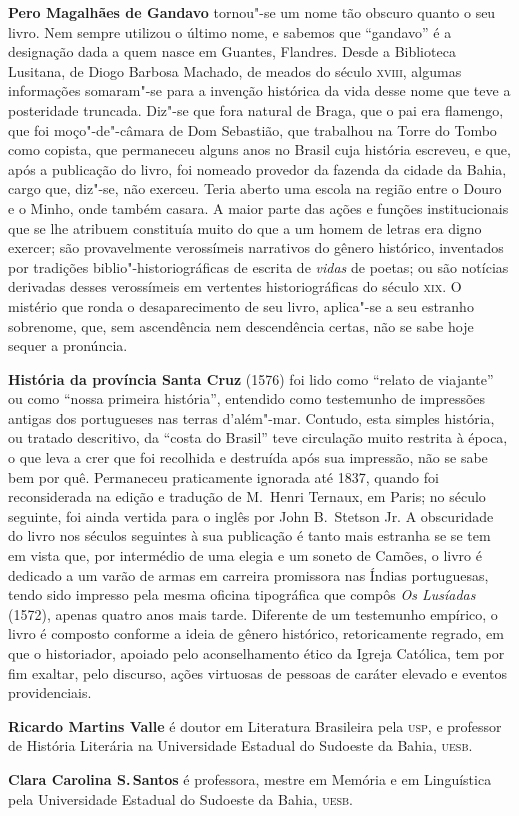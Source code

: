 
\textbf{Pero Magalhães de Gandavo} tornou"-se um nome tão
obscuro quanto o seu livro. Nem sempre utilizou o último nome, e sabemos que
``gandavo'' é a designação dada a quem nasce em Guantes, Flandres.  Desde a
Biblioteca Lusitana, de Diogo Barbosa Machado, de meados do século
\textsc{xviii}, algumas informações somaram"-se para a invenção histórica da
vida desse nome que teve a posteridade truncada. Diz"-se que fora natural de
Braga, que o pai era flamengo, que foi moço"-de"-câmara de Dom Sebastião, que
trabalhou na Torre do Tombo como copista, que permaneceu alguns anos no Brasil
cuja história escreveu, e que, após a publicação do livro, foi nomeado provedor
da fazenda da cidade da Bahia, cargo que, diz"-se, não exerceu. Teria aberto
uma escola na região entre o Douro e o Minho, onde também casara. A maior parte
das ações e funções institucionais que se lhe atribuem constituía muito do que a
um homem de letras era digno exercer; são provavelmente verossímeis narrativos
do gênero histórico, inventados por tradições biblio"-historiográficas de
escrita de \textit{vidas} de poetas; ou são notícias derivadas desses
verossímeis em vertentes historiográficas do século \textsc{xix}. O mistério que
ronda o desaparecimento de seu livro, aplica"-se a seu estranho sobrenome, que,
sem ascendência nem descendência certas, não se sabe hoje sequer a pronúncia.
       
\textbf{História da província Santa Cruz} (1576) foi lido como ``relato de
viajante'' ou como ``nossa primeira história'', entendido como testemunho de
impressões antigas dos portugueses nas terras d'além"-mar. Contudo, esta
simples história, ou tratado descritivo, da ``costa do Brasil'' teve circulação
muito restrita à época, o que leva a crer que foi recolhida e destruída após sua
impressão, não se sabe bem por quê. Permaneceu praticamente ignorada até 1837,
quando foi reconsiderada na edição e tradução de M.~Henri Ternaux, em Paris; no
século seguinte, foi ainda vertida para o inglês por John B.~Stetson Jr. A
obscuridade do livro nos séculos seguintes à sua publicação é tanto mais
estranha se se tem em vista que, por intermédio de uma elegia e um soneto de
Camões, o livro é dedicado a um varão de armas em carreira promissora nas Índias
portuguesas, tendo sido impresso pela mesma oficina tipográfica que compôs
\textit{Os Lusíadas} (1572), apenas quatro anos mais tarde. Diferente de um
testemunho empírico, o livro é composto conforme a ideia de gênero histórico,
retoricamente regrado, em que o historiador, apoiado pelo aconselhamento ético
da Igreja Católica, tem por fim exaltar, pelo discurso, ações virtuosas de
pessoas de caráter elevado e eventos providenciais. 

\textbf{Ricardo Martins Valle} é doutor em Literatura Brasileira pela
\textsc{usp}, e professor de História Literária na Universidade Estadual do
Sudoeste da Bahia, \textsc{uesb}.

\textbf{Clara Carolina S.\,Santos} é professora, mestre em Memória e em Linguística pela Universidade Estadual do Sudoeste da Bahia, \textsc{uesb}.


